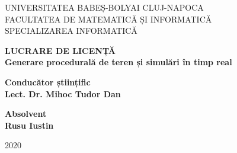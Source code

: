 \documentclass[a4paper, 12pt]{report}
\begin{document}
\begin{titlepage}

\sloppy

\begin{center}

\Large{UNIVERSITATEA BABEȘ-BOLYAI CLUJ-NAPOCA}\\
\vspace{0.2cm}
\Large{FACULTATEA DE MATEMATICĂ ȘI INFORMATICĂ}\\
\vspace{0.2cm}
\Large{SPECIALIZAREA INFORMATICĂ}\\

\end{center}

\vspace{2.5 cm}

\begin{center}

\Huge \textbf{LUCRARE DE LICENȚĂ}\\
\vspace{1 cm}
\huge \textbf{Generare procedurală de teren și simulări în timp real}

\end{center}

\vspace{2.5cm}

\begin{flushleft}

\Large{\textbf{Conducător științific}}\\
\Large{\textbf{Lect. Dr. Mihoc Tudor Dan}}

\end{flushleft}

\vspace{0.5cm}

\begin{flushright}

\Large{\textbf{Absolvent}}\\
\Large{\textbf{Rusu Iustin}}

\end{flushright}

\vspace{2cm}

\begin{center}

\Large{2020}

\end{center}

\end{titlepage}



\lhead{}

\tableofcontents

\listoffigures













\end{document}
